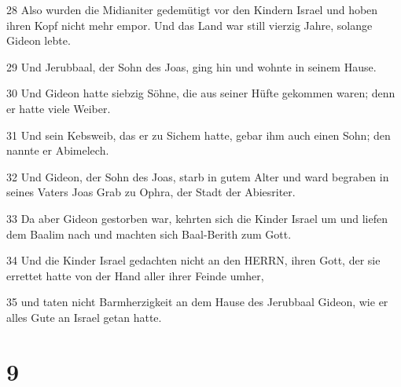 \par 28 Also wurden die Midianiter gedemütigt vor den Kindern Israel und hoben ihren Kopf nicht mehr empor. Und das Land war still vierzig Jahre, solange Gideon lebte.
\par 29 Und Jerubbaal, der Sohn des Joas, ging hin und wohnte in seinem Hause.
\par 30 Und Gideon hatte siebzig Söhne, die aus seiner Hüfte gekommen waren; denn er hatte viele Weiber.
\par 31 Und sein Kebsweib, das er zu Sichem hatte, gebar ihm auch einen Sohn; den nannte er Abimelech.
\par 32 Und Gideon, der Sohn des Joas, starb in gutem Alter und ward begraben in seines Vaters Joas Grab zu Ophra, der Stadt der Abiesriter.
\par 33 Da aber Gideon gestorben war, kehrten sich die Kinder Israel um und liefen dem Baalim nach und machten sich Baal-Berith zum Gott.
\par 34 Und die Kinder Israel gedachten nicht an den HERRN, ihren Gott, der sie errettet hatte von der Hand aller ihrer Feinde umher,
\par 35 und taten nicht Barmherzigkeit an dem Hause des Jerubbaal Gideon, wie er alles Gute an Israel getan hatte.

\chapter{9}

